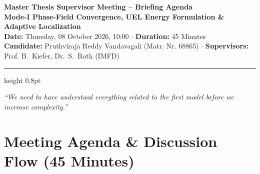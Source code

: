 \documentclass[10pt,a4paper]{article}
\begin{document}
\begin{center}
  {\Large\textbf{Master Thesis Supervisor Meeting -- Briefing Agenda}}\\[0.22em]
  {\large\textbf{Mode-I Phase-Field Convergence, UEL Energy Formulation \& Adaptive Localization}}\\[0.18em]
  {\normalsize\textbf{Date:} Thursday, 08 October 2026, 10:00 \quad $\cdot$ \quad \textbf{Duration:} 45 Minutes}\\[0.10em]
  {\footnotesize\textbf{Candidate:} Pruthviraja Reddy Vandavagali (Matr. Nr. 68865) \quad $\cdot$ \quad \textbf{Supervisors:} Prof. B.~Kiefer, Dr.~S.~Roth (IMFD)}
\end{center}
\vspace{-0.45em}
\hrule height 0.8pt
\vspace{0.35em}

\begin{tcolorbox}[colback=blue!5!white,colframe=blue!60!black,title=\textbf{Governing Supervisor Directive \& Active Phase},top=2pt,bottom=2pt,left=4pt,right=4pt]
\centering
\small\emph{``We need to have understood everything related to the first model before we increase complexity.''}
\end{tcolorbox}

\vspace{0.1em}

\section*{Meeting Agenda \& Discussion Flow (45 Minutes)}
\vspace{-0.35em}
\end{document}
